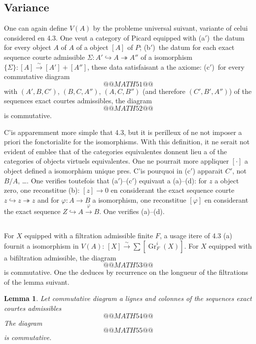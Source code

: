 \documentclass[12pt,a4paper]{article}
\theoremstyle{plain}
\newtheorem{lemma}[theorem]{Lemma}
\theoremstyle{definition}
\DeclareMathOperator{\Gr}{Gr}
\begin{document}
\subsection{Variance}

One can again define $V(A)$ by the probleme universal suivant,
variante of celui considered en 4.3. One veut a category of Picard equipped with
(a$'$)~the datum for every object $A$ of $A$ of a object $[A]$ of $P$; (b$'$)~the datum
for each exact sequence courte admissible $\Sigma: A' \hookrightarrow A \twoheadrightarrow A''$ of a isomorphism
$\{\Sigma\}: [A] \xrightarrow{\sim} [A'] + [A'']$, these data satisfaisant a the axiome: (c$'$)~for every
commutative diagram
\[
@@MATH51@@
\]
with $(A', B, C')$, $(B, C, A'')$, $(A, C, B'')$ (and therefore $(C', B', A'')$) of the
sequences exact courtes admissibles, the diagram
\[
@@MATH52@@
\]
is commutative.

C'is apparemment more simple that 4.3, but it is perilleux of ne not imposer
a priori the fonctorialite for the isomorphisms. With this definition, it ne
serait not evident of emblee that of the categories equivalentes donnent lieu a of the
categories of objects virtuels equivalentes. One ne pourrait more appliquer $[\cdot]$
a object defined a isomorphism unique pres. C'is pourquoi in (c$'$) apparait
$C'$, not $B/A$, \ldots. One verifies toutefois that (a$'$)--(c$'$) equivaut a (a)--(d):
for $z$ a object zero, one reconstitue (b): $[z] \to 0$ en considerant the exact sequence courte $z \hookrightarrow z \twoheadrightarrow z$ and for $\varphi: A \to B$ a isomorphism, one reconstitue
$[\varphi]$ en considerant the exact sequence $Z \hookrightarrow A \xrightarrow{\varphi} B$. One verifies (a)--(d).

\subsection{}

For $X$ equipped with a filtration admissible finite $F$, a usage itere of 4.3
(a) fournit a isomorphism in $V(A)$: $[X] \xrightarrow{\sim} \sum [\Gr_F^i(X)]$. For $X$ equipped with a
bifiltration admissible, the diagram
\[
@@MATH53@@
\]
is commutative. One the deduces by recurrence on the longueur of the filtrations of the
lemma suivant.

\begin{lemma}
Let commutative diagram a lignes and colonnes of the sequences exact
courtes admissibles
\[
@@MATH54@@
\]
The diagram
\[
@@MATH55@@
\]
is commutative.
\end{lemma}
\end{document}
